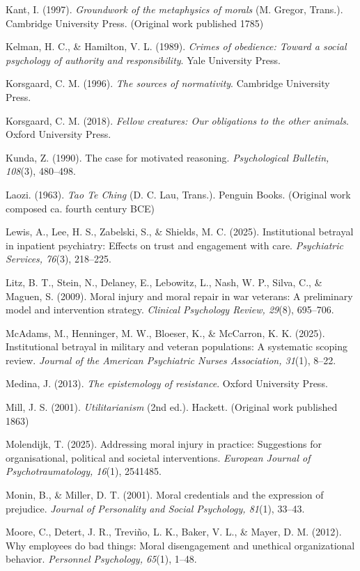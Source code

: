 \documentclass[
  11pt,
]{article}
\begin{document}
Kant, I. (1997). \emph{Groundwork of the metaphysics of morals} (M.
Gregor, Trans.). Cambridge University Press. (Original work published
1785)

Kelman, H. C., \& Hamilton, V. L. (1989). \emph{Crimes of obedience:
Toward a social psychology of authority and responsibility}. Yale
University Press.

Korsgaard, C. M. (1996). \emph{The sources of normativity}. Cambridge
University Press.

Korsgaard, C. M. (2018). \emph{Fellow creatures: Our obligations to the
other animals}. Oxford University Press.

Kunda, Z. (1990). The case for motivated reasoning. \emph{Psychological
Bulletin, 108}(3), 480--498.

Laozi. (1963). \emph{Tao Te Ching} (D. C. Lau, Trans.). Penguin Books.
(Original work composed ca. fourth century BCE)

Lewis, A., Lee, H. S., Zabelski, S., \& Shields, M. C. (2025).
Institutional betrayal in inpatient psychiatry: Effects on trust and
engagement with care. \emph{Psychiatric Services, 76}(3), 218--225.

Litz, B. T., Stein, N., Delaney, E., Lebowitz, L., Nash, W. P., Silva,
C., \& Maguen, S. (2009). Moral injury and moral repair in war veterans:
A preliminary model and intervention strategy. \emph{Clinical Psychology
Review, 29}(8), 695--706.

McAdams, M., Henninger, M. W., Bloeser, K., \& McCarron, K. K. (2025).
Institutional betrayal in military and veteran populations: A systematic
scoping review. \emph{Journal of the American Psychiatric Nurses
Association, 31}(1), 8--22.

Medina, J. (2013). \emph{The epistemology of resistance}. Oxford
University Press.

Mill, J. S. (2001). \emph{Utilitarianism} (2nd ed.). Hackett. (Original
work published 1863)

Molendijk, T. (2025). Addressing moral injury in practice: Suggestions
for organisational, political and societal interventions. \emph{European
Journal of Psychotraumatology, 16}(1), 2541485.

Monin, B., \& Miller, D. T. (2001). Moral credentials and the expression
of prejudice. \emph{Journal of Personality and Social Psychology,
81}(1), 33--43.

Moore, C., Detert, J. R., Treviño, L. K., Baker, V. L., \& Mayer, D. M.
(2012). Why employees do bad things: Moral disengagement and unethical
organizational behavior. \emph{Personnel Psychology, 65}(1), 1--48.
\end{document}

